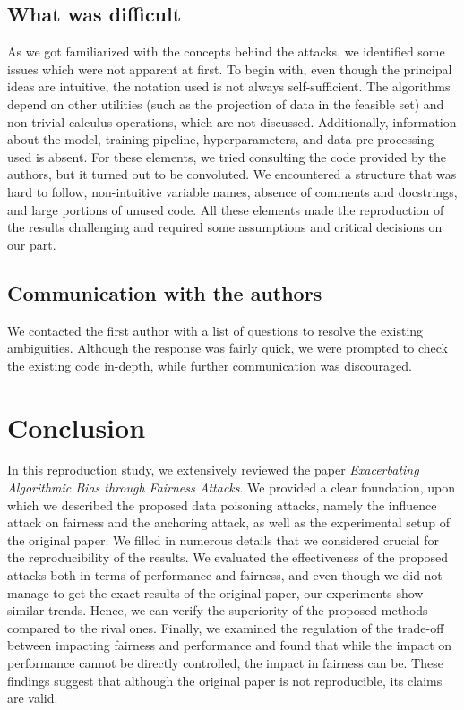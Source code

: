 \subsection{What was difficult}
As we got familiarized with the concepts behind the attacks, we identified some issues which were not apparent at first. To begin with, even though the principal ideas are intuitive, the notation used is not always self-sufficient. The algorithms depend on other utilities (such as the projection of data in the feasible set) and non-trivial calculus operations, which are not discussed. Additionally, information about the model, training pipeline, hyperparameters, and data pre-processing used is absent. For these elements, we tried consulting the code provided by the authors, but it turned out to be convoluted. We encountered a structure that was hard to follow, non-intuitive variable names, absence of comments and docstrings, and large portions of unused code. All these elements made the reproduction of the results challenging and required some assumptions and critical decisions on our part.

\subsection{Communication with the authors}
We contacted the first author with a list of questions to resolve the existing ambiguities. Although the response was fairly quick, we were prompted to check the existing code in-depth, while further communication was discouraged.

\section{Conclusion}
In this reproduction study, we extensively reviewed the paper \textit{Exacerbating Algorithmic Bias through Fairness Attacks}. We provided a clear foundation, upon which we described the proposed data poisoning attacks, namely the influence attack on fairness and the anchoring attack, as well as the experimental setup of the original paper. We filled in numerous details that we considered crucial for the reproducibility of the results. We evaluated the effectiveness of the proposed attacks both in terms of performance and fairness, and even though we did not manage to get the exact results of the original paper, our experiments show similar trends. Hence, we can verify the superiority of the proposed methods compared to the rival ones. Finally, we examined the regulation of the trade-off between impacting fairness and performance and found that while the impact on performance cannot be directly controlled, the impact in fairness can be. These findings suggest that although the original paper is not reproducible, its claims are valid.
